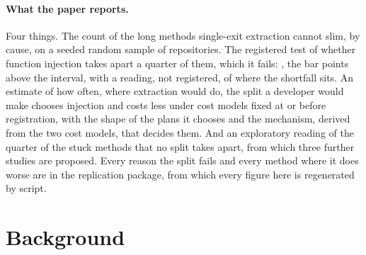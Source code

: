 \documentclass[11pt,a4paper]{article}
\begin{document}
\paragraph{What the paper reports.} Four things. The count of the long
methods single-exit extraction cannot slim, by cause, on a seeded random
sample of \nUsable{} repositories. The registered test of whether function
injection takes apart a quarter of them, which it fails: \ciCatThreeC{}, the
bar \hOneBarGap{} points above the interval, with a reading, not registered,
of where the shortfall sits. An estimate of how often, where extraction would
do, the split a developer would make chooses injection and costs less under
cost models fixed at or before registration, with the shape of the plans it
chooses and the mechanism, derived from the two cost models, that decides
them. And an exploratory reading of the quarter of the stuck methods that no
split takes apart, from which three further studies are proposed. Every
reason the split fails and every method where it does worse are in
the replication package, from which every figure here is regenerated by
script.

\section{Background}\label{sec:background}
\end{document}
